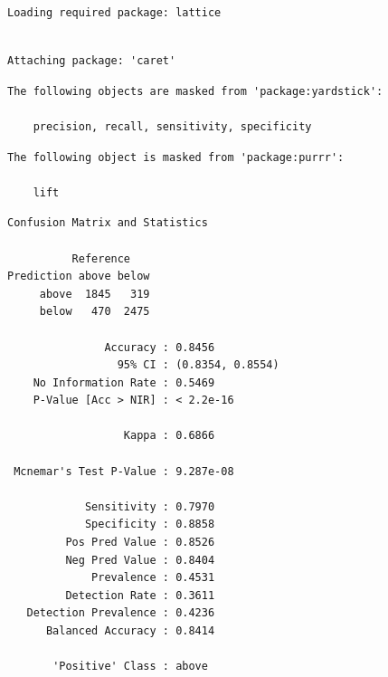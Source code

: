 \documentclass[
  letterpaper,
  DIV=11,
  numbers=noendperiod]{scrreprt}
\newenvironment{Shaded}{\begin{snugshade}}{\end{snugshade}}
\newcommand{\AttributeTok}[1]{\textcolor[rgb]{0.40,0.45,0.13}{#1}}
\newcommand{\FunctionTok}[1]{\textcolor[rgb]{0.28,0.35,0.67}{#1}}
\newcommand{\NormalTok}[1]{\textcolor[rgb]{0.00,0.23,0.31}{#1}}
\newcommand{\SpecialCharTok}[1]{\textcolor[rgb]{0.37,0.37,0.37}{#1}}
\begin{document}
\begin{verbatim}
Loading required package: lattice
\end{verbatim}

\begin{verbatim}

Attaching package: 'caret'
\end{verbatim}

\begin{verbatim}
The following objects are masked from 'package:yardstick':

    precision, recall, sensitivity, specificity
\end{verbatim}

\begin{verbatim}
The following object is masked from 'package:purrr':

    lift
\end{verbatim}

\begin{Shaded}
\end{Shaded}

\begin{verbatim}
Confusion Matrix and Statistics

          Reference
Prediction above below
     above  1845   319
     below   470  2475
                                          
               Accuracy : 0.8456          
                 95% CI : (0.8354, 0.8554)
    No Information Rate : 0.5469          
    P-Value [Acc > NIR] : < 2.2e-16       
                                          
                  Kappa : 0.6866          
                                          
 Mcnemar's Test P-Value : 9.287e-08       
                                          
            Sensitivity : 0.7970          
            Specificity : 0.8858          
         Pos Pred Value : 0.8526          
         Neg Pred Value : 0.8404          
             Prevalence : 0.4531          
         Detection Rate : 0.3611          
   Detection Prevalence : 0.4236          
      Balanced Accuracy : 0.8414          
                                          
       'Positive' Class : above           
                                          
\end{verbatim}
\end{document}
